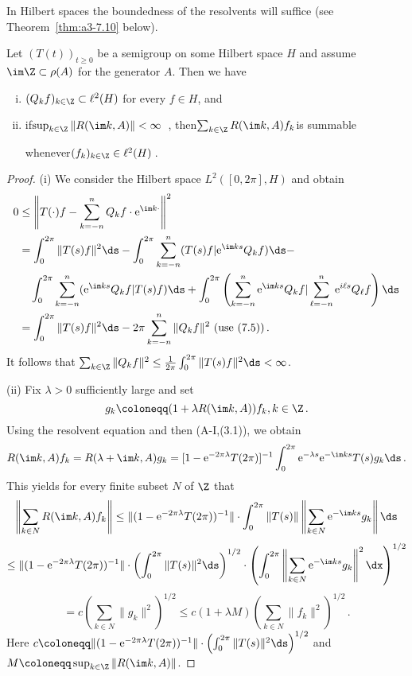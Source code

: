 In Hilbert spaces the boundedness of the resolvents will suffice (see Theorem~\ref{thm:a3-7.10} below).
\begin{lemma}\label{lem:a3-7.9}
Let $(T(t))_{t\geq 0}$ be a semigroup on some Hilbert space $H$ and assume $\im\Z \subset \rho(A)$ for the generator $A$.
Then we have
\begin{enumerate}[(i)]
\item 
$(Q_{k}f)_{k\in\Z} \subset \ell^{2}(H)$ for every $f \in H$, and

\item 
if\quad $\sup_{k\in\Z}\|R(\im k,A)\| < \infty$~, then\quad $\sum_{k\in\Z} R(\im k,A)f_{k}$\quad is summable 

whenever\quad $(f_{k})_{k\in\Z} \in \ell^{2}(H)$\,.
\end{enumerate}
\end{lemma}
\begin{proof}
(i) We consider the Hilbert space $L^{2}([0,2\pi],H)$ and obtain
\begin{align*}
0 &\leq \left\|T(\cdot)f - \sum_{k=-n}^{n} Q_{k}f\cdot \mathrm{e}^{\im k\cdot}\right\|^{2} \\
&= \int_{0}^{2\pi} \|T(s)f\|^{2} \ds - \int_{0}^{2\pi} \sum_{k=-n}^{n} (T(s)f|\mathrm{e}^{\im ks}Q_{k}f) \ds - \\
&\quad \int_{0}^{2\pi} \sum_{k=-n}^{n} (\mathrm{e}^{\im ks}Q_{k}f|T(s)f) \ds + \int_{0}^{2\pi} \left(\sum_{k=-n}^{n} \mathrm{e}^{\im ks}Q_{k}f|\sum_{\ell=-n}^{n} \mathrm{e}^{i\ell s}Q_{\ell}f\right) \ds \\
&= \int_{0}^{2\pi} \|T(s)f\|^{2} \ds - 2\pi\sum_{k=-n}^{n} \|Q_{k}f\|^{2} \text{ (use (7.5))}\,.
\end{align*}
It follows that $\sum_{k\in\Z} \|Q_{k}f\|^{2} \leq \frac{1}{2\pi}\int_{0}^{2\pi} \|T(s)f\|^{2} \ds < \infty$.

(ii) Fix $\lambda > 0$ sufficiently large and set 
\[
g_{k}\coloneqq (1 + \lambda R(\im k,A))f_{k}, k \in \Z\,.
\]
Using the resolvent equation and then (A-I,(3.1)), we obtain
\[
R(\im k,A)f_{k} = R(\lambda + \im k,A)g_{k} = [1 - \mathrm{e}^{-2\pi\lambda}T(2\pi)]^{-1}\int_{0}^{2\pi} \mathrm{e}^{-\lambda s}\mathrm{e}^{-\im ks}T(s)g_{k} \ds\,.
\]
This yields for every finite subset $N$ of $\Z$ that
\[
\left\|\sum_{k\in N} R(\im k,A)f_{k}\right\| \leq \|(1 - \mathrm{e}^{-2\pi\lambda}T(2\pi))^{-1}\|\cdot\int_{0}^{2\pi} \|T(s)\| \left\|\sum_{k\in N} \mathrm{e}^{-\im ks}g_{k}\right\| \ds
\]
\[
\leq \|(1 - \mathrm{e}^{-2\pi\lambda}T(2\pi))^{-1}\|\cdot\left(\int_{0}^{2\pi}\|T(s)\|^{2} \ds\right)^{1/2} \cdot \left(\int_{0}^{2\pi}\left\|\sum_{k\in N} \mathrm{e}^{-\im ks}g_{k}\right\|^{2} \dx\right)^{1/2}
\]
\[
= c(\sum_{k\in N} \|g_{k}\|^{2})^{1/2} \leq c(1 + \lambda M)\left(\sum_{k\in N} \|f_{k}\|^{2}\right)^{1/2}\,.
\]
Here $c\coloneqq \|(1 - \mathrm{e}^{-2\pi\lambda}T(2\pi))^{-1}\|\cdot\left(\int_{0}^{2\pi}\|T(s)\|^{2} \ds\right)^{1/2}$ and $M\coloneqq \sup_{k\in\Z}\|R(\im k,A)\|$.
\end{proof}
